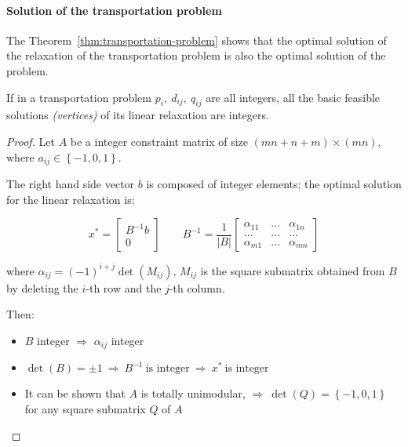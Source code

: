 \documentclass[english]{article}
\begin{document}
\paragraph{Solution of the transportation problem}

The Theorem~\ref{thm:transportation-problem} shows that the optimal solution of the \LP relaxation of the transportation problem is also the optimal solution of the \ILP problem.

\begin{theorem}
  \label{thm:transportation-problem}
  If in a transportation problem \(p_i, \ d_{ij}, \ q_{ij}\) are all integers, all the basic feasible solutions \textit{(vertices)} of its linear relaxation are integers.
\end{theorem}

\begin{proof}
  Let \(A\) be a integer constraint matrix of size \(\left( mn + n + m \right) \times \left( mn \right)\), where \(a_{ij} \in \left\{ -1, 0, 1 \right\}\).

  The right hand side vector \(b\) is composed of integer elements;
  the optimal solution for the linear relaxation is:

  \[ x^\ast = \begin{bmatrix}
      B^{-1} b \\ 0

    \end{bmatrix}
    \qquad
    B^{-1} = \dfrac{1}{|B|}
    \begin{bmatrix}
      \alpha_{11} & \dots  & \alpha_{1n} \\
      \ldots      & \ldots & \ldots      \\
      \alpha_{m1} & \dots  & \alpha_{mn}
    \end{bmatrix}
  \]

  where \(\alpha_{ij} = (-1)^{i+j} \det\left( M_{ij} \right)\), \(M_{ij}\) is the square submatrix obtained from \(B\) by deleting the \(i\)-th row and the \(j\)-th column.

  Then:
  \begin{itemize}
    \item \(B\) integer \(\Rightarrow\) \(\alpha_{ij}\) integer
    \item \(\det\left( B \right) = \pm 1 \ \Rightarrow \ B^{-1} \ \text{is integer} \ \Rightarrow \ x^\ast \ \text{is integer}\)
    \item It can be shown that \(A\) is totally unimodular, \(\Rightarrow \ \det\left( Q \right) = \left\{ -1, 0, 1 \right\}\) for any square submatrix \(Q\) of \(A\)
  \end{itemize}
\end{proof}
\end{document}
